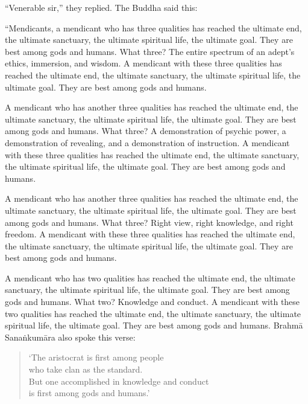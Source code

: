 \documentclass[12pt,openany]{book}%
\begin{document}
“Venerable sir,” they replied. The Buddha said this: 

“Mendicants, a mendicant who has three qualities has reached the ultimate end, the ultimate sanctuary, the ultimate spiritual life, the ultimate goal. They are best among gods and humans. What three? The entire spectrum of an adept’s ethics, immersion, and wisdom. A mendicant with these three qualities has reached the ultimate end, the ultimate sanctuary, the ultimate spiritual life, the ultimate goal. They are best among gods and humans. 

A mendicant who has another three qualities has reached the ultimate end, the ultimate sanctuary, the ultimate spiritual life, the ultimate goal. They are best among gods and humans. What three? A demonstration of psychic power, a demonstration of revealing, and a demonstration of instruction. A mendicant with these three qualities has reached the ultimate end, the ultimate sanctuary, the ultimate spiritual life, the ultimate goal. They are best among gods and humans. 

A mendicant who has another three qualities has reached the ultimate end, the ultimate sanctuary, the ultimate spiritual life, the ultimate goal. They are best among gods and humans. What three? Right view, right knowledge, and right freedom. A mendicant with these three qualities has reached the ultimate end, the ultimate sanctuary, the ultimate spiritual life, the ultimate goal. They are best among gods and humans. 

A mendicant who has two qualities has reached the ultimate end, the ultimate sanctuary, the ultimate spiritual life, the ultimate goal. They are best among gods and humans. What two? Knowledge and conduct. A mendicant with these two qualities has reached the ultimate end, the ultimate sanctuary, the ultimate spiritual life, the ultimate goal. They are best among gods and humans. \textsanskrit{Brahmā} \textsanskrit{Sanaṅkumāra} also spoke this verse: 

\begin{verse}%
‘The aristocrat is first among people \\
who take clan as the standard. \\
But one accomplished in knowledge and conduct \\
is first among gods and humans.’ 

%
\end{verse}
\end{document}
